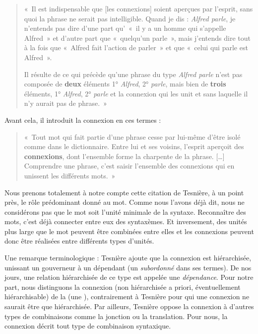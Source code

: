 \begin{quote}
    «~Il est indispensable que [les connexions] soient aperçues par l’esprit, sans quoi la phrase ne serait pas intelligible. Quand je dis : \textit{Alfred parle}, je n’entends pas dire d’une part qu’~«~il y a un homme qui s’appelle Alfred~» et d’autre part que «~quelqu’un parle~», mais j’entends dire tout à la fois que «~Alfred fait l’action de parler~» et que «~celui qui parle est Alfred~».

Il résulte de ce qui précède qu’une phrase du type \textit{Alfred parle} n’est pas composée de \textbf{deux} éléments 1° \textit{Alfred}, 2° \textit{parle}, mais bien de \textbf{trois} éléments, 1° \textit{Alfred}, 2° \textit{parle} et la connexion qui les unit et sans laquelle il n’y aurait pas de phrase.~»
\end{quote}

\noindent Avant cela, il introduit la connexion en ces termes :
\begin{quote}
    «~Tout mot qui fait partie d’une phrase cesse par lui-même d’être isolé comme dans le dictionnaire. Entre lui et ses voisins, l’esprit aperçoit des \textbf{connexions}, dont l’ensemble forme la charpente de la phrase. […] Comprendre une phrase, c’est saisir l’ensemble des connexions qui en unissent les différents mots.~»
\end{quote}
Nous prenons totalement à notre compte cette citation de Tesnière, à un point près, le rôle prédominant donné au mot. Comme nous l’avons déjà dit, nous ne considérons pas que le mot soit l’unité minimale de la syntaxe. Reconnaître des mots, c’est déjà connecter entre eux des syntaxèmes. Et inversement, des unités plus large que le mot peuvent être combinées entre elles et les connexions peuvent donc être réalisées entre différents types d’unités.

Une remarque terminologique : Tesnière ajoute que la connexion est hiérarchisée, unissant un gouverneur à un dépendant (un \textit{subordonné} dans ses termes). De nos jours, une relation hiérarchisée de ce type est appelée une \textit{dépendance}. Pour notre part, nous distinguons la connexion (non hiérarchisée a priori, éventuellement hiérarchisable) de la  (une ), contrairement à Tesnière pour qui une connexion ne saurait être que hiérarchisée. Par ailleurs, Tesnière oppose la connexion à d’autres types de combinaisons comme la jonction ou la translation. Pour nous, la connexion décrit tout type de combinaison syntaxique.

